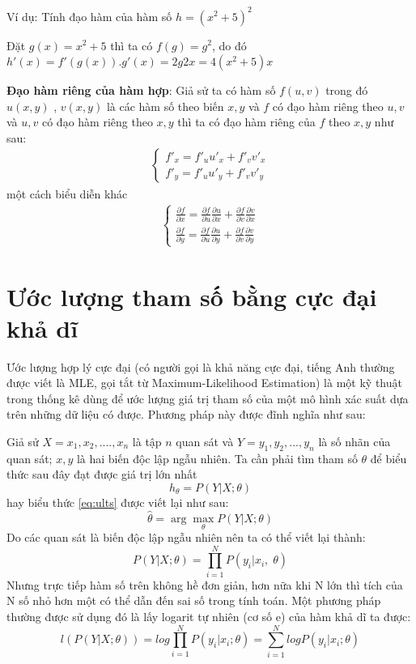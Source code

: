 Ví dụ: Tính đạo hàm của hàm số $h=(x^2+5)^2$\par
 Đặt $g(x) = x^2 +5$ thì ta có $f(g) = g^2$, do đó $h'(x) = f'(g(x)).g'(x) = 2g2x= 4(x^2 +5)x$\\ \par
\textbf{Đạo hàm riêng của hàm hợp}: Giả sử ta có hàm số $f(u,v)$ trong đó $u(x,y)$ , $v(x,y)$ là các hàm số  theo biến $x,y$ và $f$ có đạo hàm riêng theo $u,v$ và $u,v$ có đạo hàm riêng theo $x,y$ thì ta có đạo hàm riêng của $f$ theo $x,y$ như sau:
\begin{align*}
	\begin{cases}
        f'_{x} = f'_{u}u'_{x} +f'_{v}v'_{x}\\
       f'_{y} = f'_{u}u'_{y} +f'_{v}v'_{y}
    \end{cases}
\end{align*}
một cách biểu diễn khác
\begin{align}
	\begin{cases}
		\frac{\partial f}{\partial x} = 
		\frac{\partial f}{\partial u}\frac{\partial u}{\partial x} + 
		\frac{\partial f}{\partial v}\frac{\partial v}{\partial x}\\[5mm]
		\frac{\partial f}{\partial y} = \frac{\partial f}{\partial u}\frac{\partial u}{\partial y} +
		 \frac{\partial f}{\partial v}\frac{\partial v}{\partial y}
	\end{cases}
\end{align}
\section{Ước lượng tham số bằng cực đại khả dĩ}
Ước lượng hợp lý cực đại (có người gọi là khả năng cực đại, tiếng Anh thường được viết là MLE, gọi tắt từ Maximum-Likelihood Estimation) là một kỹ thuật trong thống kê dùng để ước lượng giá trị tham số của một mô hình xác suất dựa trên những dữ liệu có được. Phương pháp này được đĩnh nghĩa như sau:\par
Giả sử $X=x_1,x_2,....,x_n$ là tập $n$ quan sát và $Y=y_1,y_2,...,y_n$ là số nhãn của quan sát; $x,y$ là hai biến độc lập ngẫu nhiên. Ta cần phải tìm tham số $\theta$ để biểu thức sau đây đạt được giá trị lớn nhất
\begin{equation}
\label{eq:ults}
h_{\theta} = P(Y|X;\theta)
\end{equation} 
hay biểu thức \ref{eq:ults} được viết lại như sau:
\begin{equation}
\widehat{\theta} = \arg\max_{\theta}P(Y|X;\theta)
\end{equation}
Do các quan sát là biến độc lập ngẫu nhiên nên ta có thể viết lại thành:
\begin{equation}
P(Y|X;\theta) = \prod^N_{i=1}P(y_i|x_i,\;\theta)
\end{equation}
Nhưng trực tiếp hàm số trên không hề đơn giản, hơn nữa khi N lớn thì tích của N số nhỏ hơn một có thể dẫn đến sai số trong tính toán. Một phương pháp thường được sử dụng đó là lấy logarit	tự nhiên (cơ số e) của hàm khả dĩ ta được:
\begin{equation}
l(P(Y|X;\theta)) = log\prod_{i=1}^N P(y_i|x_i;\theta)=\sum_{i=1}^NlogP(y_i|x_i;\theta)
\end{equation}
